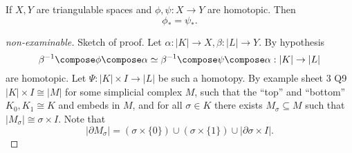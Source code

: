 \documentclass[a4paper]{article}
\renewcommand{\b}{\partial} %
\begin{document}
\begin{theorem}
  If \(X, Y\) are triangulable spaces and \(\phi, \psi: X \to Y\) are homotopic. Then
  \[
    \phi_* = \psi_*.
  \]
\end{theorem}

\begin{proof}[non-examinable]
  Sketch of proof. Let \(\alpha: |K| \to X, \beta: |L| \to Y\). By hypothesis
  \[
    \beta^{-1} \compose \phi \compose \alpha \simeq \beta^{-1} \compose \psi \compose \alpha: |K| \to |L|
  \]
  are homotopic. Let \(\Psi: |K| \times I \to |L|\) be such a homotopy. By example sheet 3 Q9 \(|K| \times I \cong |M|\) for some simplicial complex \(M\), such that the ``top'' and ``bottom'' \(K_0, K_1 \cong K\) and embeds in \(M\), and for all \(\sigma \in K\) there exists \(M_\sigma \subseteq M\) such that \(|M_\sigma| \cong \sigma \times I\). Note that
  \[
    |\b M_\sigma| = (\sigma \times \{0\}) \cup (\sigma \times \{1\}) \cup |\b \sigma \times I|.
  \]
  
\end{proof}







\printindex
\end{document}
